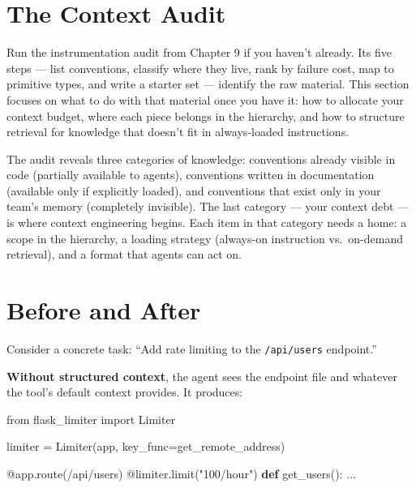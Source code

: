 \documentclass[
  a4paper,
  DIV=11,
  numbers=noendperiod]{scrreprt}
\newenvironment{Shaded}{\begin{snugshade}}{\end{snugshade}}
\newcommand{\AttributeTok}[1]{\textcolor[rgb]{0.40,0.45,0.13}{#1}}
\newcommand{\ImportTok}[1]{\textcolor[rgb]{0.00,0.46,0.62}{#1}}
\newcommand{\KeywordTok}[1]{\textcolor[rgb]{0.00,0.23,0.31}{\textbf{#1}}}
\newcommand{\NormalTok}[1]{\textcolor[rgb]{0.00,0.23,0.31}{#1}}
\newcommand{\OperatorTok}[1]{\textcolor[rgb]{0.37,0.37,0.37}{#1}}
\newcommand{\StringTok}[1]{\textcolor[rgb]{0.13,0.47,0.30}{#1}}
\begin{document}
\section{The Context Audit}\label{the-context-audit}

Run the instrumentation audit from Chapter 9 if you haven't already. Its
five steps --- list conventions, classify where they live, rank by
failure cost, map to primitive types, and write a starter set ---
identify the raw material. This section focuses on what to do with that
material once you have it: how to allocate your context budget, where
each piece belongs in the hierarchy, and how to structure retrieval for
knowledge that doesn't fit in always-loaded instructions.

The audit reveals three categories of knowledge: conventions already
visible in code (partially available to agents), conventions written in
documentation (available only if explicitly loaded), and conventions
that exist only in your team's memory (completely invisible). The last
category --- your context debt --- is where context engineering begins.
Each item in that category needs a home: a scope in the hierarchy, a
loading strategy (always-on instruction vs.~on-demand retrieval), and a
format that agents can act on.

\section{Before and After}\label{before-and-after-1}

Consider a concrete task: ``Add rate limiting to the \texttt{/api/users}
endpoint.''

\textbf{Without structured context}, the agent sees the endpoint file
and whatever the tool's default context provides. It produces:

\begin{Shaded}
\begin{Highlighting}[]
\ImportTok{from}\NormalTok{ flask\_limiter }\ImportTok{import}\NormalTok{ Limiter}

\NormalTok{limiter }\OperatorTok{=}\NormalTok{ Limiter(app, key\_func}\OperatorTok{=}\NormalTok{get\_remote\_address)}

\AttributeTok{@app.route}\NormalTok{(}\StringTok{\textquotesingle{}/api/users\textquotesingle{}}\NormalTok{)}
\AttributeTok{@limiter.limit}\NormalTok{(}\StringTok{"100/hour"}\NormalTok{)}
\KeywordTok{def}\NormalTok{ get\_users():}
\NormalTok{    ...}
\end{Highlighting}
\end{Shaded}
\end{document}
